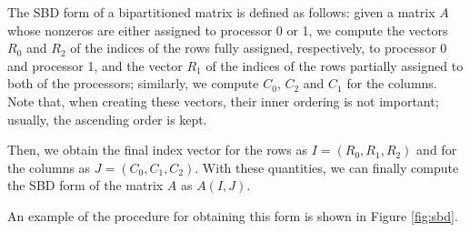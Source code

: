 The SBD form of a bipartitioned matrix \cite{yzelman_cache} is defined as follows: given a matrix $A$ whose nonzeros are either assigned to processor 0 or 1, we compute the vectors $R_0$ and $R_2$ of the indices of the rows fully assigned, respectively, to processor 0 and processor 1, and the vector $R_1$ of the indices of the rows partially assigned to both of the processors; similarly, we compute $C_0$, $C_2$ and $C_1$ for the columns. Note that, when creating these vectors, their inner ordering is not important; usually, the ascending order is kept.

Then, we obtain the final index vector for the rows as $I = (R_0,R_1,R_2)$ and for the columns as $J = (C_0,C_1,C_2)$. With these quantities, we can finally compute the SBD form of the matrix $A$ as $A(I,J)$. 

An example of the procedure for obtaining this form is shown in Figure \ref{fig:sbd}.

